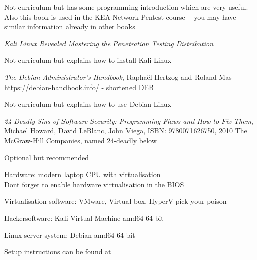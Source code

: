 \documentclass[Screen16to9,17pt]{foils}
\begin{document}
Not curriculum but has some programming introduction which are very useful.
Also this book is used in the KEA Network Pentest course -- you may have similar information already in other books





\emph{Kali Linux Revealed  Mastering the Penetration Testing Distribution}

Not curriculum but explains how to install Kali Linux




\emph{The Debian Administrator’s Handbook}, Raphaël Hertzog and Roland Mas\\
\url{https://debian-handbook.info/} - shortened DEB

Not curriculum but explains how to use Debian Linux



\emph{24 Deadly Sins of Software Security: Programming Flaws and How to Fix Them}, Michael Howard, David LeBlanc, John Viega, ISBN: 9780071626750, 2010 The McGraw-Hill Companies, named 24-deadly below

Optional but recommended







\begin{list2}
\item Hardware: modern laptop CPU with virtualisation\\
Dont forget to enable hardware virtualisation in the BIOS
\item Virtualisation software: VMware, Virtual box, HyperV pick your poison
\item Hackersoftware: Kali Virtual Machine amd64 64-bit 
\item Linux server system: Debian amd64 64-bit 
\item Setup instructions can be found at 
\end{list2}
\end{document}
